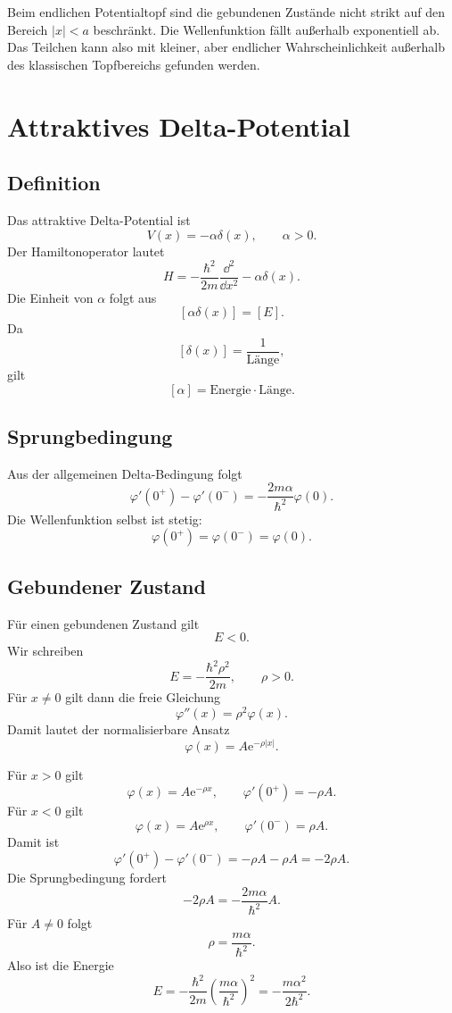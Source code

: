 \begin{conceptbox}
Beim endlichen Potentialtopf sind die gebundenen Zustände nicht strikt auf den Bereich $|x|<a$ beschränkt. Die Wellenfunktion fällt außerhalb exponentiell ab. Das Teilchen kann also mit kleiner, aber endlicher Wahrscheinlichkeit außerhalb des klassischen Topfbereichs gefunden werden.
\end{conceptbox}

\section{Attraktives Delta-Potential}

\subsection{Definition}

Das attraktive Delta-Potential ist
\[
    V(x)=-\alpha\delta(x),
    \qquad \alpha>0.
\]
Der Hamiltonoperator lautet
\[
    H=-\frac{\hbar^2}{2m}\frac{\dd^2}{\dd x^2}-\alpha\delta(x).
\]
Die Einheit von $\alpha$ folgt aus
\[
    [\alpha\delta(x)]=[E].
\]
Da
\[
    [\delta(x)]=\frac{1}{\text{Länge}},
\]
gilt
\[
    [\alpha]=\text{Energie}\cdot\text{Länge}.
\]

\subsection{Sprungbedingung}

Aus der allgemeinen Delta-Bedingung folgt
\[
    \varphi'(0^+)-\varphi'(0^-)
    =-\frac{2m\alpha}{\hbar^2}\varphi(0).
\]
Die Wellenfunktion selbst ist stetig:
\[
    \varphi(0^+)=\varphi(0^-)=\varphi(0).
\]

\subsection{Gebundener Zustand}

Für einen gebundenen Zustand gilt
\[
    E<0.
\]
Wir schreiben
\[
    E=-\frac{\hbar^2\rho^2}{2m},
    \qquad \rho>0.
\]
Für $x\ne0$ gilt dann die freie Gleichung
\[
    \varphi''(x)=\rho^2\varphi(x).
\]
Damit lautet der normalisierbare Ansatz
\[
    \varphi(x)=A\mathrm{e}^{-\rho|x|}.
\]

\begin{derivationbox}
Für $x>0$ gilt
\[
    \varphi(x)=A\mathrm{e}^{-\rho x},
    \qquad
    \varphi'(0^+)=-\rho A.
\]
Für $x<0$ gilt
\[
    \varphi(x)=A\mathrm{e}^{\rho x},
    \qquad
    \varphi'(0^-)=\rho A.
\]
Damit ist
\[
    \varphi'(0^+)-\varphi'(0^-)
    =-\rho A-\rho A
    =-2\rho A.
\]
Die Sprungbedingung fordert
\[
    -2\rho A=-\frac{2m\alpha}{\hbar^2}A.
\]
Für $A\ne0$ folgt
\[
    \rho=\frac{m\alpha}{\hbar^2}.
\]
Also ist die Energie
\[
    E=-\frac{\hbar^2}{2m}\left(\frac{m\alpha}{\hbar^2}\right)^2
    =-\frac{m\alpha^2}{2\hbar^2}.
\]
\end{derivationbox}

